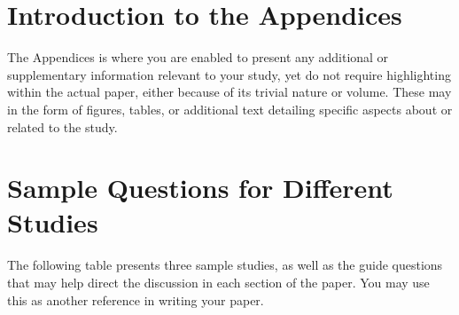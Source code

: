 \section{Introduction to the Appendices}

The Appendices is where you are enabled to present any additional or supplementary information relevant to your study, yet do not require highlighting within the actual paper, either because of its trivial nature or volume. These may in the form of figures, tables, or additional text detailing specific aspects about or related to the study.

\section{Sample Questions for Different Studies}
The following table presents three sample studies, as well as the guide questions that may help direct the discussion in each section of the paper. You may use this as another reference in writing your paper.

